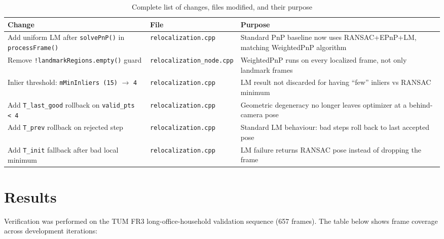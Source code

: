 \documentclass[12pt,a4paper]{article}
\begin{document}
\begin{table}[H]
\centering
\caption{Complete list of changes, files modified, and their purpose}
\begin{tabular}{p{4.8cm} p{4.2cm} p{5.0cm}}
\toprule
Change & File & Purpose \\
\midrule
Add uniform LM after \texttt{solvePnP()} in \texttt{processFrame()} &
  \texttt{relocalization.cpp} &
  Standard PnP baseline now uses RANSAC+EPnP+LM, matching WeightedPnP algorithm \\
\addlinespace
Remove \texttt{!landmarkRegions.empty()} guard &
  \texttt{relocalization\_node.cpp} &
  WeightedPnP runs on every localized frame, not only landmark frames \\
\addlinespace
Inlier threshold: \texttt{mMinInliers\,(15)} $\to$ \texttt{4} &
  \texttt{relocalization.cpp} &
  LM result not discarded for having ``few'' inliers vs RANSAC minimum \\
\addlinespace
Add \texttt{T\_last\_good} rollback on \texttt{valid\_pts\,<\,4} &
  \texttt{relocalization.cpp} &
  Geometric degeneracy no longer leaves optimizer at a behind-camera pose \\
\addlinespace
Add \texttt{T\_prev} rollback on rejected step &
  \texttt{relocalization.cpp} &
  Standard LM behaviour: bad steps roll back to last accepted pose \\
\addlinespace
Add \texttt{T\_init} fallback after bad local minimum &
  \texttt{relocalization.cpp} &
  LM failure returns RANSAC pose instead of dropping the frame \\
\bottomrule
\end{tabular}
\end{table}

\section{Results}

Verification was performed on the TUM FR3 long-office-household validation sequence
(657 frames). The table below shows frame coverage across development iterations:
\end{document}
